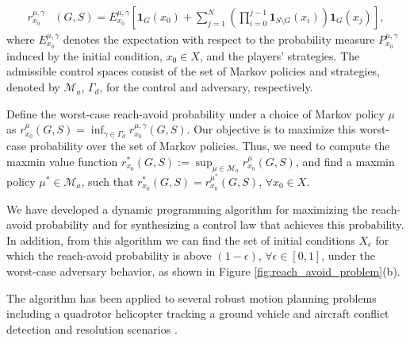                  \begin{align*}
                   \label{eq:reachavoid_prob_expectation}
                   r_{x_0}^{\mu, \gamma}&(G,S) = E^{\mu,\gamma}_{x_0} \left[ \mathbf{1}_G(x_0) + \sum^{N}_{j=1}\left(\prod^{j-1}_{i=0}\mathbf{1}_{S\setminus G}(x_i)\right)\mathbf{1}_G(x_j)\right],
                 \end{align*}
                 where $E^{\mu,\gamma}_{x_0}$ denotes the expectation
                 with respect to the probability measure
                 $P_{x_0}^{\mu, \gamma}$ induced by the initial
                 condition, $x_0 \in X$, and the players'
                 strategies. The admissible control spaces consist of
                 the set of Markov policies and strategies, denoted by
                 $\mathcal{M}_a$, $\Gamma_d$, for the control and
                 adversary, respectively.

                 Define the worst-case reach-avoid probability under a
                 choice of Markov policy $\mu$ as $r_{x_0}^\mu(G,S) =
                 \inf_{\gamma \in \Gamma_d} r_{x_0}^{\mu,
                   \gamma}(G,S).$ Our objective is to maximize this
                 worst-case probability over the set of Markov
                 policies. Thus, we need to compute the maxmin value
                 function $r_{x_0}^*(G,S) := \sup_{\mu \in
                   \mathcal{M}_a} r_{x_0}^\mu(G,S)$, and find a maxmin
                 policy $\mu^* \in \mathcal{M}_a$, such that
                 $r_{x_0}^*(G,S) = r_{x_0}^{\mu^*}(G,S)$, $\forall x_0
                 \in X$.

                 We have developed a dynamic programming algorithm for
                 maximizing the reach-avoid probability and for
                 synthesizing a control law that achieves this
                 probability. In addition, from this algorithm we can
                 find the set of initial conditions $X_\epsilon$ for
                 which the reach-avoid probability is above
                 $(1-\epsilon)$, $\forall \epsilon \in [0,1]$, under
                 the worst-case adversary behavior, as shown in Figure
                 \ref{fig:reach_avoid_problem}(b).

                 The algorithm has been applied to several robust
                 motion planning problems including a quadrotor
                 helicopter tracking a ground vehicle and aircraft
                 conflict detection and resolution scenarios
                 \cite{kamgar2011cdc}.

